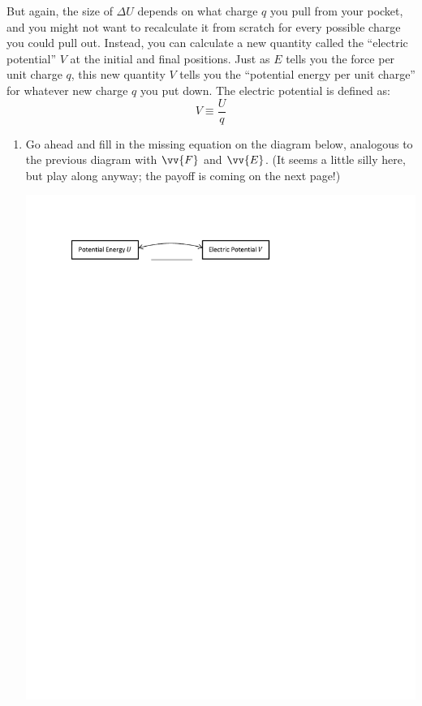 But again, the size of $\Delta U$ depends on what charge $q$ you pull from your pocket, and you might not want to recalculate it from scratch for every possible charge you could pull out.  Instead, you can calculate a new quantity called the ``electric potential'' $V$ at the initial and final positions.  Just as $E$ tells you the force per unit charge $q$, this new quantity $V$ tells you the ``potential energy per unit charge'' for whatever new charge $q$ you put down.  The electric potential is defined as:
$$V \equiv \frac{U}{q}$$
\vspace{-0.3 in}
\begin{enumerate}[labparts]

\item Go ahead and fill in the missing equation on the diagram below, analogous to the previous diagram with $\vv{F}$ and $\vv{E}$.  (It seems a little silly here, but play along anyway; the payoff is coming on the next page!)
\begin{center}
\includegraphics{potential_intro/concept_map_figs/concept_map_U_and_V_blank.pdf}
\end{center}


\end{enumerate}
